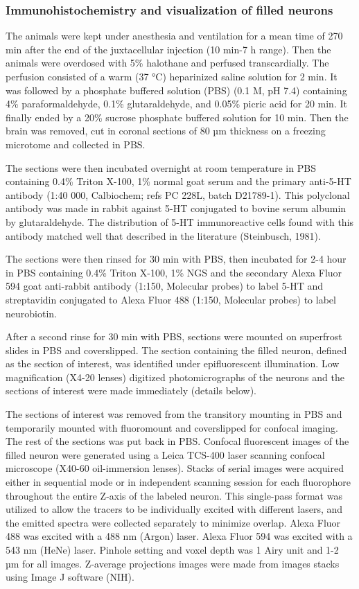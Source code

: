\documentclass[a4paper,12pt,twoside]{report}
\begin{document}
\subsubsection{Immunohistochemistry and visualization of filled neurons}

The animals were kept under anesthesia and ventilation for a mean time of 270 min after the end of the juxtacellular injection (10 min-7 h range). Then the animals were overdosed with 5\% halothane and perfused transcardially. The perfusion consisted of a warm (37 °C) heparinized saline solution for 2 min. It was followed by a phosphate buffered solution (PBS) (0.1 M, pH 7.4) containing 4\% paraformaldehyde, 0.1\% glutaraldehyde, and 0.05\% picric acid for 20 min. It finally ended by a 20\% sucrose phosphate buffered solution for 10 min. Then the brain was removed, cut in coronal sections of 80 µm thickness on a freezing microtome and collected in PBS. 

The sections were then incubated overnight at room temperature in PBS containing 0.4\% Triton X-100, 1\% normal goat serum and the primary anti-5-HT antibody (1:40 000, Calbiochem; refs PC 228L, batch D21789-1). This polyclonal antibody was made in rabbit against 5-HT conjugated to bovine serum albumin by glutaraldehyde. The distribution of 5-HT immunoreactive cells found with this antibody matched well that described in the literature (Steinbusch, 1981). 

The sections were then rinsed for 30 min with PBS, then incubated for 2-4 hour in PBS containing 0.4\% Triton X-100, 1\% NGS and the secondary Alexa Fluor 594 goat anti-rabbit antibody (1:150, Molecular probes) to label 5-HT and streptavidin conjugated to Alexa Fluor 488 (1:150, Molecular probes) to label neurobiotin. 

After a second rinse for 30 min with PBS, sections were mounted on superfrost slides in PBS and coverslipped. The section containing the filled neuron, defined as the section of interest, was identified under epifluorescent illumination. Low magnification (X4-20 lenses) digitized photomicrographs of the neurons and the sections of interest were made immediately (details below). 

The sections of interest was removed from the transitory mounting in PBS and temporarily mounted with fluoromount and coverslipped for confocal imaging. The rest of the sections was put back in PBS. Confocal fluorescent images of the filled neuron were generated using a Leica TCS-400 laser scanning confocal microscope (X40-60 oil-immersion lenses). Stacks of serial images were acquired either in sequential mode or in independent scanning session for each fluorophore throughout the entire Z-axis of the labeled neuron. This single-pass format was utilized to allow the tracers to be individually excited with different lasers, and the emitted spectra were collected separately to minimize overlap. Alexa Fluor 488 was excited with a 488 nm (Argon) laser. Alexa Fluor 594 was excited with a 543 nm (HeNe) laser. Pinhole setting and voxel depth was 1 Airy unit and 1-2 µm for all images. Z-average projections images were made from images stacks using Image J software (NIH).
\end{document}
